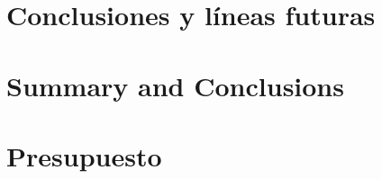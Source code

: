 \documentclass[spanish,a4paper,14pt,oneside]{extreport}
\begin{document}


\newpage{\pagestyle{empty}}
\thispagestyle{empty}

\chapter{Conclusiones y líneas futuras}
\label{chapter:Conclusiones}



\newpage{\pagestyle{empty}}
\thispagestyle{empty}

\chapter{Summary and Conclusions }
\label{chapter:ingles}



\newpage{\pagestyle{empty}}
\thispagestyle{empty}

\chapter{Presupuesto}
\label{chapter:Presupuesto}








\end{document}
